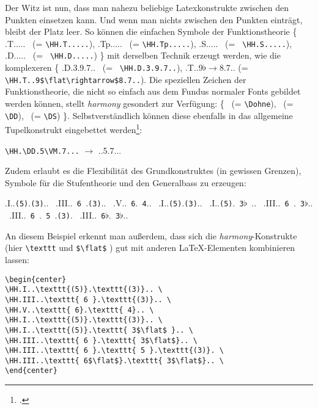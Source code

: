 Der Witz ist nun, dass man nahezu beliebige Latexkonstrukte zwischen den Punkten
einsetzen kann. Und wenn man nichts zwischen den Punkten einträgt, bleibt der
Platz leer. So können die einfachen Symbole der Funktionstheorie \{ \HH.T.....
\ (= \texttt{\small \textbackslash{HH.T.....}}), \HH.Tp.....  \ (=
\texttt{\small \textbackslash{HH.Tp.....}}), \HH.S.....  \ (= \texttt{\small
\textbackslash{HH.S.....}}), \HH.D.....  \ (= \texttt{\small
\textbackslash{HH.D.....}}) \} mit derselben Technik erzeugt werden, wie die
komplexeren \{ \HH.D.3.9.7..  \ (= \texttt{\small
\textbackslash{HH.D.3.9.7..}}), \HH.T..9$\flat\rightarrow$8.7..  (=
\verb|\HH.T..9$\flat\rightarrow$8.7..|).
Die speziellen Zeichen der Funktionstheorie, die nicht so einfach aus dem Fundus
normaler Fonts gebildet werden können, stellt  \textit{harmony} gesondert zur
Verfügung:
\{ \Dohne  \ (= \texttt{\small \textbackslash{Dohne}}), \DD \ (= \texttt{\small
\textbackslash{DD}}), \DS  \ (= \texttt{\small \textbackslash{DS}}) \}.
Selbstverständlich können diese ebenfalls in das allgemeine Tupelkonstrukt
eingebettet werden\footcite[Vgl. dazu][6]{WegWeg2007a}:
\begin{center}
 \texttt{\textbackslash{HH}.\textbackslash{DD}.5\textbackslash{VM}.7...} 
 $\rightarrow$ \HH.\DD.5\VM.7...
\end{center}

Zudem erlaubt es die Flexibilität des Grundkonstruktes (in gewissen Grenzen),
Symbole für die Stufentheorie und den Generalbass zu erzeugen:

\begin{center}
\HH.I..\texttt{(5)}.\texttt{(3)}.. \ 
\HH.III..\texttt{ 6 }.\texttt{(3)}.. \ 
\HH.V..\texttt{ 6}.\texttt{ 4}.. \ 
\HH.I..\texttt{(5)}.\texttt{(3)}.. \ 
\HH.I..\texttt{(5)}.\texttt{ 3$\flat$ }.. \ 
\HH.III..\texttt{ 6 }.\texttt{ 3$\flat$}.. \ 
\HH.III..\texttt{ 6 }.\texttt{ 5 }.\texttt{(3)}. \ 
\HH.III..\texttt{ 6$\flat$}.\texttt{ 3$\flat$}.. \ 
\end{center}

An diesem Beispiel erkennt man außerdem, dass sich die
\textit{harmony}-Konstrukte (hier \texttt{\textbackslash{texttt}} und
\texttt{\$\textbackslash{flat}\$} ) gut mit anderen \LaTeX-Elementen kombinieren
lassen:
\begin{verbatim}
\begin{center}
\HH.I..\texttt{(5)}.\texttt{(3)}.. \ 
\HH.III..\texttt{ 6 }.\texttt{(3)}.. \ 
\HH.V..\texttt{ 6}.\texttt{ 4}.. \ 
\HH.I..\texttt{(5)}.\texttt{(3)}.. \ 
\HH.I..\texttt{(5)}.\texttt{ 3$\flat$ }.. \ 
\HH.III..\texttt{ 6 }.\texttt{ 3$\flat$}.. \ 
\HH.III..\texttt{ 6 }.\texttt{ 5 }.\texttt{(3)}. \ 
\HH.III..\texttt{ 6$\flat$}.\texttt{ 3$\flat$}.. \ 
\end{center}
\end{verbatim}

